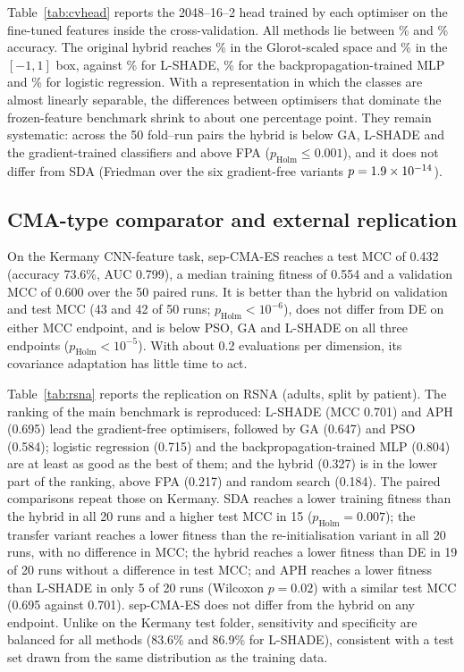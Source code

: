 \documentclass[10pt,letterpaper]{article}
\begin{document}


Table~\ref{tab:cvhead} reports the 2048--16--2 head trained by each optimiser on the fine-tuned features inside the cross-validation. All methods lie between \CvHeadMin\% and \CvHeadMax\% accuracy. The original hybrid reaches \CvHeadHybrid\% in the Glorot-scaled space and \CvHeadHybridBox\% in the $[-1,1]$ box, against \CvHeadLshade\% for L-SHADE, \CvHeadMlp\% for the backpropagation-trained MLP and \CvHeadLogreg\% for logistic regression. With a representation in which the classes are almost linearly separable, the differences between optimisers that dominate the frozen-feature benchmark shrink to about one percentage point. They remain systematic: across the 50 fold--run pairs the hybrid is below GA, L-SHADE and the gradient-trained classifiers and above FPA ($p_{\mathrm{Holm}}\le0.001$), and it does not differ from SDA (Friedman over the six gradient-free variants $p=1.9\times 10^{-14}$).



\subsection{CMA-type comparator and external replication}\label{sec:rsna}
On the Kermany CNN-feature task, sep-CMA-ES reaches a test MCC of 0.432 (accuracy 73.6\%, AUC 0.799), a median training fitness of 0.554 and a validation MCC of 0.600 over the 50 paired runs. It is better than the hybrid on validation and test MCC (43 and 42 of 50 runs; $p_{\mathrm{Holm}}<10^{-6}$), does not differ from DE on either MCC endpoint, and is below PSO, GA and L-SHADE on all three endpoints ($p_{\mathrm{Holm}}<10^{-5}$). With about 0.2 evaluations per dimension, its covariance adaptation has little time to act.

Table~\ref{tab:rsna} reports the replication on RSNA (adults, split by patient). The ranking of the main benchmark is reproduced: L-SHADE (MCC 0.701) and APH (0.695) lead the gradient-free optimisers, followed by GA (0.647) and PSO (0.584); logistic regression (0.715) and the backpropagation-trained MLP (0.804) are at least as good as the best of them; and the hybrid (0.327) is in the lower part of the ranking, above FPA (0.217) and random search (0.184). The paired comparisons repeat those on Kermany. SDA reaches a lower training fitness than the hybrid in all 20 runs and a higher test MCC in 15 ($p_{\mathrm{Holm}}=0.007$); the transfer variant reaches a lower fitness than the re-initialisation variant in all 20 runs, with no difference in MCC; the hybrid reaches a lower fitness than DE in 19 of 20 runs without a difference in test MCC; and APH reaches a lower fitness than L-SHADE in only 5 of 20 runs (Wilcoxon $p=0.02$) with a similar test MCC (0.695 against 0.701). sep-CMA-ES does not differ from the hybrid on any endpoint. Unlike on the Kermany test folder, sensitivity and specificity are balanced for all methods (83.6\% and 86.9\% for L-SHADE), consistent with a test set drawn from the same distribution as the training data.
\end{document}
